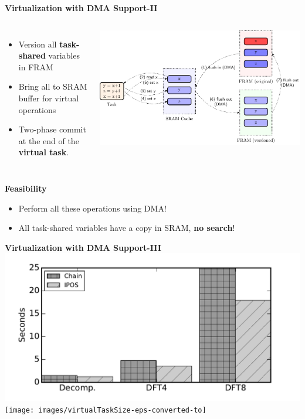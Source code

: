 \begin{frame}{\textbf{Virtualization with DMA Support-II}}
	\begin{columns}		
		
		\begin{itemize}
			\item Version all \textbf{task-shared} variables in FRAM
			\item Bring all to SRAM buffer for virtual operations
			\item Two-phase commit at the end of the \textbf{virtual task}.
		\end{itemize}
		
		
		\includegraphics[scale=0.5]{images/dma.pdf}	
	\end{columns}
	
	\begin{block}{\textbf{Feasibility}}
		\begin{itemize}
			\item Perform all these operations using DMA!
			\item All task-shared variables have a copy in SRAM, \textbf{no search}!
		\end{itemize}	
	\end{block}
	
\end{frame}



\begin{frame}{\textbf{Virtualization with DMA Support-III}}
	\center
	\includegraphics[scale=0.27]{images/executionTime-eps-converted-to}	
	\texttt{[image: images/virtualTaskSize-eps-converted-to]}
	
\end{frame}

